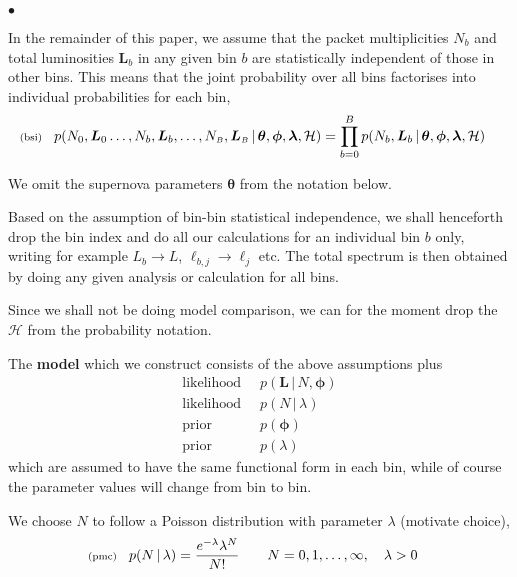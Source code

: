 \documentclass[11pt]{article}
\newcommand{\lleq}[1]{\label{#1} }
\renewcommand{\lleq}[1]{\label{#1} {\scriptstyle {\rm (#1)}} \hspace*{2ex} }
\newenvironment{mtemize}{
  \begin{list}{$\bullet$}
    {\setlength{\itemsep}{0pt}
     \setlength{\leftmargin}{3ex}
    }
  }
  {\end{list}}
\newcommand{\hmod}  {{\mathcal{H}}}  %
\newcommand{\cond}{\,|\,}
\newcommand{\smB}{{\scriptscriptstyle B}}
\newcommand{\bmL}{{\bm{L}}}
\newcommand{\bmphi}{{\bm{\phi}}}
\newcommand{\bmlambda}{{\bm{\lambda}}}
\newcommand{\bmtheta}{{\bm{\theta}}}
\begin{document}
\begin{mtemize}
\item In the remainder of this paper, we assume that the packet
  multiplicities $N_b$ and total luminosities $\bmL_b$ in any given
  bin $b$ are statistically independent of those in other bins. This
  means that the joint probability over all bins factorises into
  individual probabilities for each bin,
  \begin{align}
    \lleq{bsi}
    p(N_0,\bmL_0\ldots,N_b,\bmL_b,\ldots,N_\smB,\bmL_\smB
    \cond \bmtheta,\bmphi,\bmlambda,\hmod)
    &= \prod_{b=0}^B p(N_b,\bmL_b\cond \bmtheta,\bmphi,\bmlambda,\hmod)
  \end{align}

\item We omit the supernova parameters $\bmtheta$ from the notation
  below.

\item Based on the assumption of bin-bin statistical independence, we
  shall henceforth drop the bin index and do all our calculations for
  an individual bin $b$ only, writing for example $L_b \to L$,
  $\ell_{b,j} \to \ell_j$ etc. The total spectrum is then obtained by
  doing any given analysis or calculation for all bins.

\item Since we shall not be doing model comparison, we can for the
  moment drop the $\hmod$ from the probability notation.

\item The \textbf{model} which we construct consists of the above
  assumptions plus
  \begin{align*}
    \text{likelihood } &\ p(\bmL\cond N,\bmphi)\\
    \text{likelihood } &\ p(N\cond\lambda)\\
    \text{prior } &\ p(\bmphi)\\
    \text{prior } &\ p(\lambda)
  \end{align*}
  which are assumed to have the same functional form in each bin,
  while of course the parameter values will change from bin to bin.

\item We choose $N$ to follow a Poisson distribution with parameter
  $\lambda$ (motivate choice),
  \begin{align}
    \lleq{pmc}
    p(N\cond\lambda) &= \frac{e^{-\lambda}\lambda^N}{N!}
    \qquad N = 0,1,\ldots,\infty,\quad \lambda>0
  \end{align}


\end{mtemize}
\end{document}

